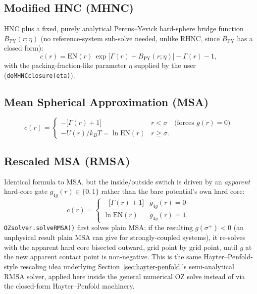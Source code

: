 \documentclass[11pt,a4paper]{article}
\newcommand{\code}[1]{\texttt{#1}}
\begin{document}
\subsection{Modified HNC (MHNC)}
HNC plus a fixed, purely analytical Percus--Yevick hard-sphere bridge function
$B_{\mathrm{PY}}(r;\eta)$ (no reference-system sub-solve needed, unlike RHNC,
since $B_{\mathrm{PY}}$ has a closed form):
\begin{equation}
  c(r) = \mathrm{EN}(r)\,\exp\!\big[\Gamma(r) + B_{\mathrm{PY}}(r;\eta)\big] - \Gamma(r) - 1,
\end{equation}
with the packing-fraction-like parameter $\eta$ supplied by the user
(\code{doMHNCclosure(eta)}).

\subsection{Mean Spherical Approximation (MSA)}
\begin{equation}
  c(r) = \begin{cases} -\big[\Gamma(r)+1\big] & r<\sigma \quad\text{(forces }g(r){=}0)\\
    -U(r)/k_BT = \ln\mathrm{EN}(r) & r\ge\sigma. \end{cases}
\end{equation}

\subsection{Rescaled MSA (RMSA)}
\label{sec:rmsa-closure}
Identical formula to MSA, but the inside/outside switch is driven by an
\emph{apparent} hard-core gate $g_{4g}(r)\in\{0,1\}$ rather than the bare
potential's own hard core:
\begin{equation}
  c(r) = \begin{cases} -\big[\Gamma(r)+1\big] & g_{4g}(r)=0\\ \ln\mathrm{EN}(r) & g_{4g}(r)=1. \end{cases}
\end{equation}
\code{OZsolver.solveRMSA()} first solves plain MSA; if the resulting
$g(\sigma^+)<0$ (an unphysical result plain MSA can give for strongly-coupled
systems), it re-solves with the apparent hard core bisected outward, grid
point by grid point, until $g$ at the new apparent contact point is
non-negative. This is the same Hayter--Penfold-style rescaling idea underlying
Section~\ref{sec:hayter-penfold}'s semi-analytical RMSA solver, applied here
inside the general numerical OZ solve instead of via the closed-form
Hayter--Penfold machinery.
\end{document}
